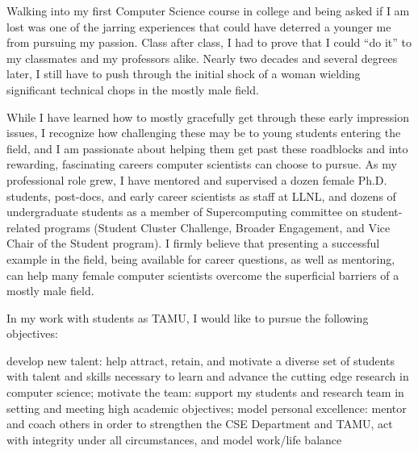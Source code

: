 \documentclass[11pt]{article}
\begin{document}
Walking into my first Computer Science course in college and being asked if I am lost was one of the jarring experiences that could have deterred a younger me from pursuing my passion.  Class after class, I had to prove that I could ``do it''
to my classmates and my professors alike.  Nearly two decades and several degrees later, I still have to push through the initial shock of a woman wielding significant technical chops in the mostly male field.

While I have learned how to mostly gracefully get through these early impression issues, I recognize how challenging these may be to young students entering the field, and I am passionate about helping them get past these roadblocks and into rewarding, fascinating careers computer scientists can choose to pursue.  As my professional role grew, I have mentored and supervised a dozen female Ph.D. students, post-docs, and early career scientists as staff at LLNL, and dozens of undergraduate students as a member of Supercomputing committee on student-related programs (Student Cluster Challenge, Broader Engagement, and Vice Chair of the Student program).  I firmly believe that presenting a successful example in the field, being available for career questions, as well as mentoring, can help many female computer scientists overcome the superficial barriers of a mostly male field.

In my work with students as TAMU, I would like to pursue the following objectives:

develop new talent: help attract, retain, and motivate a diverse set of students with talent and skills necessary to learn and advance the cutting edge research in computer science;
motivate the team: support my students and research team in setting and meeting high academic objectives;
model personal excellence: mentor and coach others in order to strengthen the CSE Department and TAMU, act with integrity under all circumstances, and model work/life balance~
\end{document}
